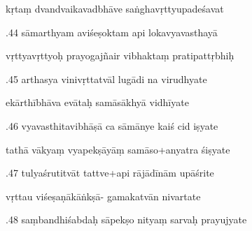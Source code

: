 \documentclass[article,12pt,a4paper]{memoir}%
\newcounter{parCount}
\begin{document}
	  
	  \pstart \leavevmode%
	kṛtaṃ dvandvaikavadbhāve saṅghavṛttyupadeśavat 
	{}
	\pend%
      

	  
	  \pstart {}.44 sāmarthyam aviśeṣoktam api lokavyavasthayā 
	{}
	\pend%
      

	  
	  \pstart \leavevmode%
	vṛttyavṛttyoḥ prayogajñair vibhaktaṃ pratipattṛbhiḥ 
	{}
	\pend%
      

	  
	  \pstart {}.45 arthasya vinivṛttatvāl lugādi na virudhyate 
	{}
	\pend%
      

	  
	  \pstart \leavevmode%
	ekārthībhāva evātaḥ samāsākhyā vidhīyate 
	{}
	\pend%
      

	  
	  \pstart {}.46 vyavasthitavibhāṣā ca sāmānye kaiś cid iṣyate 
	{}
	\pend%
      

	  
	  \pstart \leavevmode%
	tathā vākyaṃ vyapekṣāyāṃ samāso+anyatra śiṣyate 
	{}
	\pend%
      

	  
	  \pstart {}.47 tulyaśrutitvāt tattve+api rājādīnām upāśrite 
	{}
	\pend%
      

	  
	  \pstart \leavevmode%
	vṛttau viśeṣaṇākāṅkṣā- gamakatvān nivartate 
	{}
	\pend%
      

	  
	  \pstart {}.48 saṃbandhiśabdaḥ sāpekṣo nityaṃ sarvaḥ prayujyate 
	{}
	\pend%
      
\end{document}
